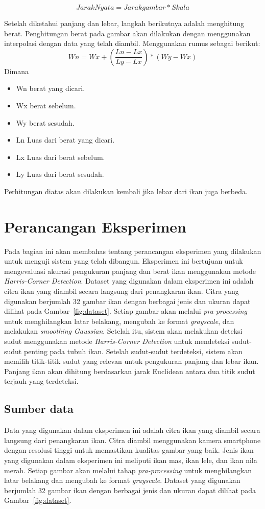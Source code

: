 \begin{equation}
    Jarak Nyata = Jarak gambar * Skala
\end{equation}

    Setelah diketahui panjang dan lebar, langkah berikutnya adalah menghitung berat. Penghitungan berat pada gambar akan dilakukan dengan menggunakan interpolasi dengan data yang telah diambil. Menggunakan rumus sebagai berikut:
\begin{equation}
    Wn = Wx + (\frac{Ln - Lx}{Ly - Lx}) * (Wy - Wx)
\end{equation}
Dimana 
\begin{itemize} 
    \item Wn berat yang dicari.
    \item Wx berat sebelum.
    \item Wy berat sesudah.
    \item Ln Luas dari berat yang dicari.
    \item Lx Luas dari berat sebelum.
    \item Ly Luas dari berat sesudah.
\end{itemize}
    Perhitungan diatas akan dilakukan kembali jika lebar dari ikan juga berbeda.

    \section{Perancangan Eksperimen}
   Pada bagian ini akan membahas tentang perancangan eksperimen yang dilakukan untuk menguji sistem yang telah dibangun. Eksperimen ini bertujuan untuk mengevaluasi akurasi pengukuran panjang dan berat ikan menggunakan metode \emph{Harris-Corner Detection}.
   Dataset yang digunakan dalam eksperimen ini adalah citra ikan yang diambil secara langsung dari penangkaran ikan.
   Citra yang digunakan berjumlah 32 gambar ikan dengan berbagai jenis dan ukuran dapat dilihat pada Gambar~\ref{fig:dataset}.
   Setiap gambar akan melalui \emph{pra-processing} untuk menghilangkan latar belakang, mengubah ke format \emph{grayscale}, dan melakukan \emph{smoothing Gaussian}.
   Setelah itu, sistem akan melakukan deteksi sudut menggunakan metode \emph{Harris-Corner Detection} untuk mendeteksi sudut-sudut penting pada tubuh ikan.
   Setelah sudut-sudut terdeteksi, sistem akan memilih titik-titik sudut yang relevan untuk pengukuran panjang dan lebar ikan.
   Panjang ikan akan dihitung berdasarkan jarak Euclidean antara dua titik sudut terjauh yang terdeteksi.

\subsection{Sumber data}
    Data yang digunakan dalam eksperimen ini adalah citra ikan yang diambil secara langsung dari penangkaran ikan. Citra diambil menggunakan kamera smartphone dengan resolusi tinggi untuk memastikan kualitas gambar yang baik.
Jenis ikan yang digunakan dalam eksperimen ini meliputi ikan mas, ikan lele, dan ikan nila merah. Setiap gambar akan melalui tahap \emph{pra-processing} untuk menghilangkan latar belakang dan mengubah ke format \emph{grayscale}. Dataset yang digunakan berjumlah 32 gambar ikan dengan berbagai jenis dan ukuran dapat dilihat pada Gambar~\ref{fig:dataset}.

